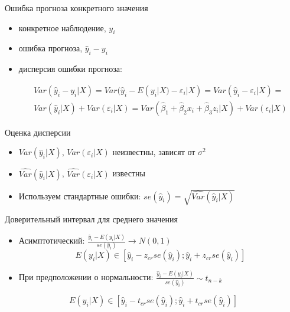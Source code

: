\documentclass[russian,ignorenonframetext,]{beamer}
\newcommand{\e}{\varepsilon}
\newcommand{\hy}{\hat{y}}
\begin{document}
\begin{frame}{Ошибка прогноза конкретного значения}

\begin{itemize}
\item
  конкретное наблюдение, \(y_i\)
\item
  ошибка прогноза, \(\hy_i - y_i\)
\item
  дисперсия ошибки прогноза:

  \begin{multline} \nonumber
  Var(\hat{y}_i - y_i | X)=Var(\hat{y}_i - E(y_i | X) - \varepsilon_i | X) = Var(\hat{y}_i - \varepsilon_i | X) = \\
  Var(\hat{y}_i|X) + Var( \varepsilon_i | X) = Var(\hat{\beta}_1 +\hat{\beta}_2 x_i + \hat{\beta}_3 z_i | X) + Var(\epsilon_i | X)
  \end{multline}
\end{itemize}

\end{frame}

\begin{frame}{Оценка дисперсии}

\begin{itemize}
\item
  \(Var(\hat{y}_i |X )\), \(Var(\e_i | X)\) неизвестны, зависят от
  \(\sigma^2\)
\item
  \(\widehat{Var}(\hat{y}_i |X )\), \(\widehat{Var}(\e_i | X)\) известны
\item
  Используем стандартные ошибки:
  \(se(\hat{y}_i) = \sqrt{\widehat{Var}(\hat{y}_i |X )}\)
\end{itemize}

\end{frame}

\begin{frame}{Доверительный интервал для среднего значения}

\begin{itemize}
\item
  Асимптотический:
  \(\frac{\hat{y}_i - E(y_i | X)}{se(\hat{y}_i)} \to N(0,1)\) \[
  E(y_i | X) \in [\hat{y}_i - z_{cr} se(\hat{y}_i);\hat{y}_i + z_{cr} se(\hat{y}_i) ]
  \]
\item
  При предположении о нормальности:
  \(\frac{\hat{y}_i - E(y_i | X)}{se(\hat{y}_i)} \sim t_{n-k}\)
\end{itemize}

\[
E(y_i | X) \in [\hat{y}_i - t_{cr} se(\hat{y}_i);\hat{y}_i + t_{cr} se(\hat{y}_i) ]
\]

\end{frame}
\end{document}
